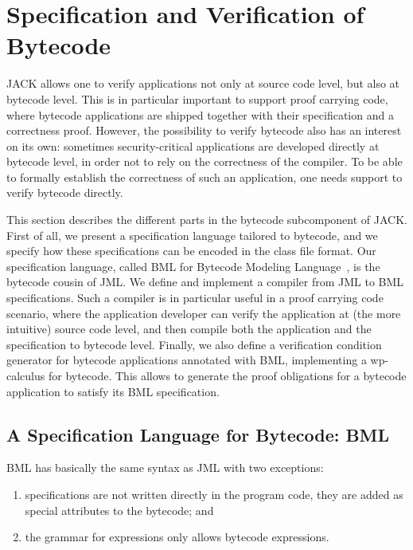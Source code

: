 \section{Specification and Verification of Bytecode}\label{SecBytecode}

JACK allows one to verify applications not only at source code level,
but also at bytecode level. This is in particular important to support
proof carrying code, where bytecode applications are shipped together
with their specification and a correctness proof. However, the
possibility to verify bytecode also has an interest on its own: 
sometimes security-critical applications are developed directly at
bytecode level, in order not to rely on the correctness of the
compiler. To be able to formally establish the correctness of such an
application, one needs support to verify bytecode directly.

This section describes the different parts in the bytecode
subcomponent of JACK. First of all, we present a specification
language tailored to bytecode, and we specify how these specifications
can be encoded in the class file format. Our specification language,
called BML for Bytecode Modeling Language~\cite{BurdyHP07}, is the
bytecode cousin of JML. We define and implement a compiler from JML to
BML specifications. Such a compiler is in particular useful in a proof
carrying code scenario, where the application developer can verify the
application at (the more intuitive) source code level, and then
compile both the application and the specification to bytecode
level. Finally, we also define a verification condition generator for
bytecode applications annotated with BML, implementing a wp-calculus
for bytecode. This allows to generate the proof obligations for a
bytecode application to satisfy its BML specification.

\subsection{A Specification Language for Bytecode: BML}

BML has basically the same syntax as JML with two exceptions:
\begin{enumerate}
\item specifications are not written directly in the program code,
they are added as special attributes to the bytecode; and
\item the grammar for expressions only allows bytecode expressions.
\end{enumerate}

